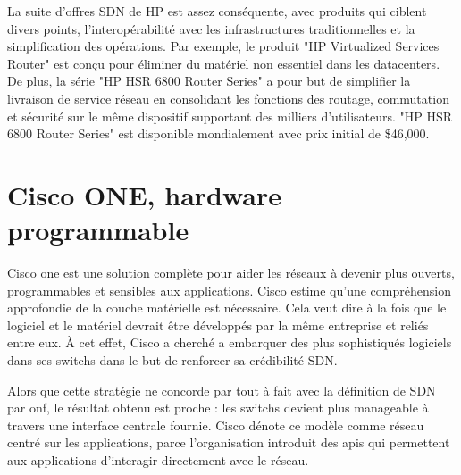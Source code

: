 
La suite d'offres SDN de HP est assez conséquente, avec produits qui ciblent divers points, l'interopérabilité avec les infrastructures traditionnelles et la simplification des opérations. Par exemple, le produit "HP Virtualized Services Router" est conçu pour éliminer du matériel non essentiel dans les \glspl{datacenter}. De plus, la série "HP HSR 6800 Router Series" a pour but de simplifier la livraison de service réseau en consolidant les fonctions des routage, commutation et sécurité sur le même dispositif supportant des milliers d'utilisateurs. "HP HSR 6800 Router Series" est disponible mondialement avec prix initial de \$46,000. \cite{ExecutiveGuideToSDNHPFabric}



\section{Cisco ONE, hardware programmable}

Cisco \gls{one} est une solution complète pour aider les réseaux à devenir plus ouverts, programmables et sensibles aux applications. Cisco estime qu'une compréhension approfondie de la couche matérielle est nécessaire. Cela veut dire à la fois que le logiciel et le matériel devrait être développés par la même entreprise et reliés entre eux. À cet effet, Cisco a cherché a embarquer des plus sophistiqués logiciels dans ses switchs dans le but de renforcer sa crédibilité SDN. 

Alors que cette stratégie ne concorde par tout à fait avec la définition de SDN par \gls{onf}, le résultat obtenu est proche : les switchs devient plus manageable à travers une interface centrale fournie. Cisco dénote ce modèle comme réseau centré sur les applications, parce l'organisation introduit des \glspl{api} qui permettent aux applications d'interagir directement avec le réseau. \cite{CiscoSDNONE}

